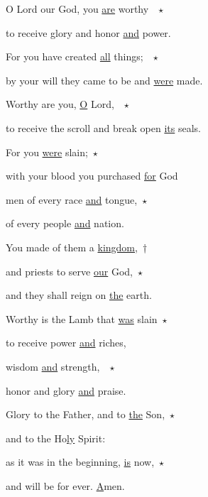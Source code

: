 \noindent O Lord our God, you \uline{are} worthy ~$\star$~\nopagebreak

to receive glory and honor \uline{and} power.

\noindent For you have created \uline{all} things; ~$\star$~\nopagebreak

by your will they came to be and \uline{were} made.

\noindent Worthy are you, \uline{O} Lord, ~$\star$~\nopagebreak

to receive the scroll and break open \uline{its} seals.

\noindent For you \uline{were} slain;~$\star$~\nopagebreak

with your blood you purchased \uline{for} God

\noindent men of every race \uline{and} tongue,~$\star$~\nopagebreak

of every people \uline{and} nation.

\noindent You made of them a \uline{kingdom},~†~\nopagebreak

and priests to serve \uline{our} God,~$\star$~\nopagebreak

and they shall reign on \uline{the} earth.

\noindent Worthy is the Lamb that \uline{was} slain~$\star$~\nopagebreak

to receive power \uline{and} riches,

\noindent wisdom \uline{and} strength, ~$\star$~\nopagebreak

honor and glory \uline{and} praise.

\noindent Glory to the Father, and to \uline{the} Son,~$\star$~\nopagebreak

and to the Ho\uline{ly} Spirit:

\noindent as it was in the beginning, \uline{is} now,~$\star$~\nopagebreak

and will be for ever. \uline{A}men.

